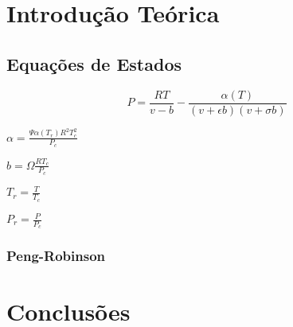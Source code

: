 \section{Introdução Teórica}

\subsection{Equações de Estados}

\begin{equation}\label{eq:001}
P = \frac{RT}{v - b} - \frac{\alpha(T)}{(v + \epsilon b)(v + \sigma b)}
\end{equation}

$\alpha = \displaystyle\frac{\Psi\alpha(T_r)R^2T_c^2}{P_c}$

$b = \displaystyle\Omega\frac{RT_c}{P_c}$

$T_r = \displaystyle\frac{T}{T_c}$

$P_r = \displaystyle\frac{P}{P_c}$

\subsubsection{Peng-Robinson}




\section{Conclusões}




